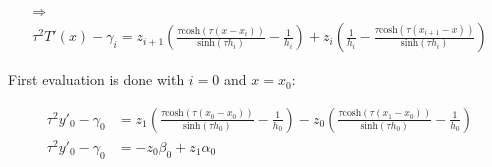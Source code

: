 \documentclass{article}
\begin{document}
\begin{multline*}
           \Rightarrow
           \\
           \tau^2T'(x)
           -
           \gamma_i
           =
           z_{i+1}
           (
             \frac{
               \tau\textrm{cosh}(\tau(x-x_{i}))
             }
             {
               \textrm{sinh}(\tau h_i)
             }
             -
             \frac {
               1
             }
             {
               h_i
             }
           )
           +
           z_i
           (
             \frac {
               1
             }
             {
               h_i
             }
             -
             \frac{
               \tau\mathrm{cosh}(\tau(x_{i+1}-x))
             }
             {
               \textrm{sinh}(\tau h_i)
             }
           )
  \end{multline*}

  First evaluation is done with $i=0$ and $x=x_0$:

  \begin{align*}
           \tau^2y'_0
           -
           \gamma_0
           &=
           z_{1}
           (
             \frac{
               \tau\textrm{cosh}(\tau(x_0-x_{0}))
             }
             {
               \textrm{sinh}(\tau h_0)
             }
             -
             \frac {
               1
             }
             {
               h_0
             }
           )
           -z_0
           (
             \frac{
               \tau\mathrm{cosh}(\tau(x_{1}-x_0))
             }
             {
               \textrm{sinh}(\tau h_0)
             }
             -
             \frac {
               1
             }
             {
               h_0
             }
           )
           \\
           \tau^2y'_0
           -
           \gamma_0
           &=
           -z_0\beta_0
           +
           z_{1}\alpha_0
  \end{align*}
\end{document}
